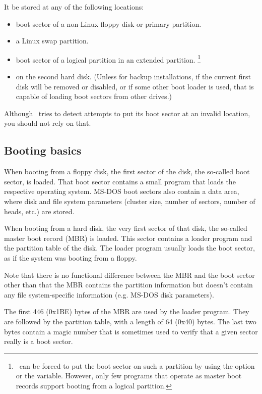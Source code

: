 It  be stored at any of the following locations:

\begin{itemize}
  \item boot sector of a non-Linux floppy disk or primary partition.
  \item a Linux swap partition.
  \item boot sector of a logical partition in an extended partition.%
\footnote{\LILO\ can be forced to put the boot sector on such a
 partition by using the  option or the  variable.
 However, only few programs that operate as master boot records
 support booting from a logical partition.}
  \item on the second hard disk. (Unless for backup installations,
    if the current first disk will be removed or disabled, or if some
    other boot loader is used, that is capable of loading boot sectors from
    other drives.)
\end{itemize}

Although \LILO\ tries to detect attempts to put its boot sector at an
invalid location, you should not rely on that.


\subsection{Booting basics}

When booting from a floppy disk, the first sector of the disk, the so-called
boot sector, is loaded. That boot sector contains a small program that loads
the respective operating system. MS-DOS boot sectors also contain 
a data area, where disk and file system parameters (cluster size, number of
sectors, number of heads, etc.) are stored.

When booting from a hard disk, the very first sector of that disk, the
so-called master boot record (MBR) is loaded. This sector contains a
loader program and the partition table of the disk. The loader program
usually loads the boot sector, as if the system was booting from a floppy.

Note that there is no functional difference between the MBR and the boot
sector other than that the MBR contains the partition information but
doesn't contain any file system-specific information (e.g. MS-DOS disk
parameters).

The first 446 (0x1BE) bytes of the MBR are used by the loader program.
They are followed by the partition table, with a length of 64 (0x40)
bytes. The last two bytes contain a magic number that is sometimes used to
verify that a given sector really is a boot sector.

